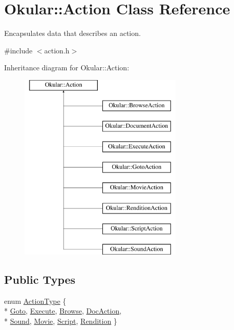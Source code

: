 \hypertarget{classOkular_1_1Action}{\section{Okular\+:\+:Action Class Reference}
\label{classOkular_1_1Action}
}


Encapsulates data that describes an action.  




{\ttfamily \#include $<$action.\+h$>$}

Inheritance diagram for Okular\+:\+:Action\+:\begin{figure}[H]
\begin{center}
\leavevmode
\includegraphics[height=9.000000cm]{classOkular_1_1Action}
\end{center}
\end{figure}
\subsection*{Public Types}
\begin{DoxyCompactItemize}
\item 
enum \hyperlink{classOkular_1_1Action_abe474735af30ea76105595533df9ec47}{Action\+Type} \{ \\*
\hyperlink{classOkular_1_1Action_abe474735af30ea76105595533df9ec47a3561c8768d2c750b59fbed36c41f336d}{Goto}, 
\hyperlink{classOkular_1_1Action_abe474735af30ea76105595533df9ec47a04ece2216c075107b03f6d91739252c2}{Execute}, 
\hyperlink{classOkular_1_1Action_abe474735af30ea76105595533df9ec47a7b94e3d79ff6813ba8444b1d98ca4756}{Browse}, 
\hyperlink{classOkular_1_1Action_abe474735af30ea76105595533df9ec47a3830ede3c1951ff5b024691981fa3385}{Doc\+Action}, 
\\*
\hyperlink{classOkular_1_1Action_abe474735af30ea76105595533df9ec47ae1bf0d24610ef55451f2a122bbf48a3c}{Sound}, 
\hyperlink{classOkular_1_1Action_abe474735af30ea76105595533df9ec47a3f395946dc29cf3a0db5f3d6d67d653a}{Movie}, 
\hyperlink{classOkular_1_1Action_abe474735af30ea76105595533df9ec47ab8871d08c0e3ac56f1ecc9521d4abeb8}{Script}, 
\hyperlink{classOkular_1_1Action_abe474735af30ea76105595533df9ec47abb9c459303f1d82e284acada9ba28ee5}{Rendition}
 \}
\end{DoxyCompactItemize}
